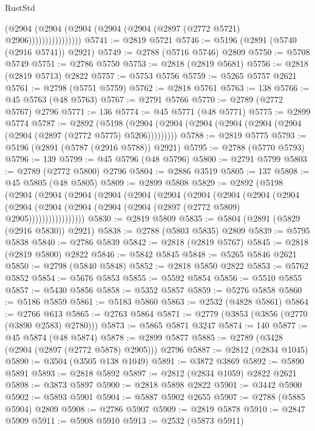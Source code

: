 \begin{lexlean}{RustStd}
\begin{coremodule}
                        (@2904
                          (@2904 (@2904 (@2904 (@2904 (@2897 (@2772 @5721) @2906))))))))))))))))
@5741 := @2819 @5721
@5746 := @5196 (@2891 (@5740 (@2916 @5741)) @2921)
@5749 := @2788 (@5716 @5746) @2809
@5750 := @5708 @5749
@5751 := @2786 @5750
@5753 := @2818 (@2819 @5681)
@5756 := @2818 (@2819 @5713) @2822
@5757 := @5753 @5756
@5759 := @5265 @5757 @2621
@5761 := @2798 (@5751 @5759)
@5762 := @2818 @5761
@5763 := 138
@5766 := @45 @5763 (@48 @5763)
@5767 := @2791 @5766
@5770 := @2789 (@2772 @5767) @2796
@5771 := 136
@5774 := @45 @5771 (@48 @5771)
@5775 := @2899 @5774
@5787 := @2892
    (@5198 (@2904 (@2904 (@2904 (@2904 (@2904 (@2904 (@2904 (@2897 (@2772 @5775) @5206)))))))))
@5788 := @2819 @5775
@5793 := @5196 (@2891 (@5787 (@2916 @5788)) @2921)
@5795 := @2788 (@5770 @5793)
@5796 := 139
@5799 := @45 @5796 (@48 @5796)
@5800 := @2791 @5799
@5803 := @2789 (@2772 @5800) @2796
@5804 := @2886 @3519
@5805 := 137
@5808 := @45 @5805 (@48 @5805)
@5809 := @2899 @5808
@5829 := @2892
    (@5198
      (@2904
        (@2904
          (@2904
            (@2904
              (@2904
                (@2904
                  (@2904
                    (@2904
                      (@2904
                        (@2904
                          (@2904
                            (@2904 (@2904 (@2904 (@2904 (@2897 (@2772 @5809) @2905)))))))))))))))))
@5830 := @2819 @5809
@5835 := @5804 (@2891 (@5829 (@2916 @5830)) @2921)
@5838 := @2788 (@5803 @5835) @2809
@5839 := @5795 @5838
@5840 := @2786 @5839
@5842 := @2818 (@2819 @5767)
@5845 := @2818 (@2819 @5800) @2822
@5846 := @5842 @5845
@5848 := @5265 @5846 @2621
@5850 := @2798 (@5840 @5848)
@5852 := @2818 @5850 @2822
@5853 := @5762 @5852
@5854 := @5676 @5853
@5855 := @5592 @5854
@5856 := @5510 @5855
@5857 := @5430 @5856
@5858 := @5352 @5857
@5859 := @5276 @5858
@5860 := @5186 @5859
@5861 := @5183 @5860
@5863 := @2532 (@4828 @5861)
@5864 := @2766 @613
@5865 := @2763 @5864
@5871 := @2779 (@3853 (@3856 (@2770 (@3890 @2583) @2780)))
@5873 := @5865 @5871 @3247
@5874 := 140
@5877 := @45 @5874 (@48 @5874)
@5878 := @2899 @5877
@5885 := @2789 (@3428 (@2904 (@2897 (@2772 @5878) @2905))) @2796
@5887 := @2812 (@2834 @1045)
@5890 := @3504 (@3505 @138 @1049)
@5891 := @3872 @3869
@5892 := @5890 @5891
@5893 := @2818 @5892
@5897 := @2812 (@2834 @1059) @2822 @2621
@5898 := @3873 @5897
@5900 := @2818 @5898 @2822
@5901 := @3442 @5900
@5902 := @5893 @5901
@5904 := @5887 @5902 @2655
@5907 := @2788 (@5885 @5904) @2809
@5908 := @2786 @5907
@5909 := @2819 @5878
@5910 := @2847 @5909
@5911 := @5908 @5910
@5913 := @2532 (@5873 @5911)

\end{coremodule}
\end{lexlean}
